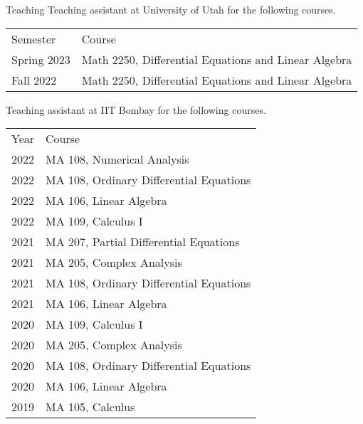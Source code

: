 
\begin{rubric}{Teaching}
	\entry*[2022-2023]  Teaching assistant at University of Utah for the following courses.

	\begin{tabular}{@{}ll}
		Semester & Course \\ %
		Spring 2023 & Math 2250, Differential Equations and Linear Algebra \\
		Fall 2022 & Math 2250, Differential Equations and Linear Algebra \\
	\end{tabular}

	\entry*[2019-2022] Teaching assistant at IIT Bombay for the following courses. 

	\begin{tabular}{@{}ll}
		Year & Course \\ %
		2022 & MA 108, Numerical Analysis \\
		2022 & MA 108, Ordinary Differential Equations \\
		2022 & MA 106, Linear Algebra \\
		2022 & MA 109, Calculus I \\
		2021 & MA 207, Partial Differential Equations \\ %
		2021 & MA 205, Complex Analysis \\ %
		2021 & MA 108, Ordinary Differential Equations \\ %
		2021 & MA 106, Linear Algebra \\ %
		2020 & MA 109, Calculus I \\ %
		2020 & MA 205, Complex Analysis \\ %
		2020 & MA 108, Ordinary Differential Equations \\ %
		2020 & MA 106, Linear Algebra \\ %
       	2019 & MA 105, Calculus \\ %
    \end{tabular}


\end{rubric}
